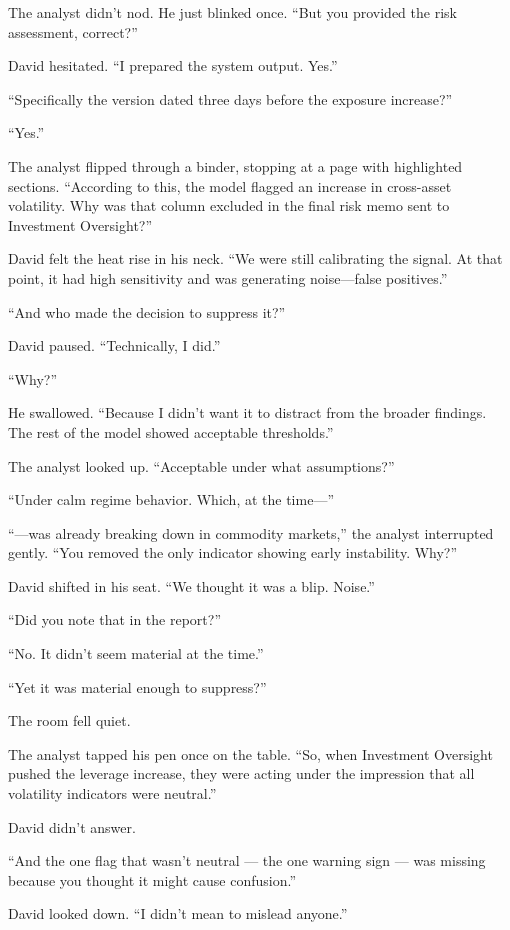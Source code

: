 The analyst didn’t nod. He just blinked once. ``But you provided the risk assessment, correct?''

David hesitated. ``I prepared the system output. Yes.''

``Specifically the version dated three days before the exposure increase?''

``Yes.''

The analyst flipped through a binder, stopping at a page with highlighted sections. ``According to this, the model 
flagged an increase in cross-asset volatility. Why was that column excluded in the final risk memo sent to 
Investment Oversight?''

David felt the heat rise in his neck. ``We were still calibrating the signal. At that point, it had high sensitivity 
and was generating noise—false positives.''

``And who made the decision to suppress it?''

David paused. ``Technically, I did.''

``Why?''

He swallowed. ``Because I didn’t want it to distract from the broader findings. The rest of the model showed 
acceptable thresholds.''

The analyst looked up. ``Acceptable under what assumptions?''

``Under calm regime behavior. Which, at the time—''

``—was already breaking down in commodity markets,'' the analyst interrupted gently. ``You removed the only 
indicator showing early instability. Why?''

David shifted in his seat. ``We thought it was a blip. Noise.''

``Did you note that in the report?''

``No. It didn’t seem material at the time.''

``Yet it was material enough to suppress?''

The room fell quiet.

The analyst tapped his pen once on the table. ``So, when Investment Oversight pushed the leverage increase, 
they were acting under the impression that all volatility indicators were neutral.''

David didn’t answer.

``And the one flag that wasn’t neutral — the one warning sign — was missing because you thought it might cause confusion.''

David looked down. ``I didn’t mean to mislead anyone.''

